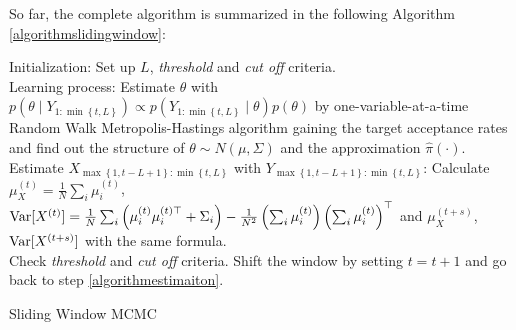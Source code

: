 So far, the complete algorithm is summarized in the following Algorithm \ref{algorithmslidingwindow}: 

\begin{algorithm}[h]
\SetAlgoLined 
Initialization: Set up $L$, \textit{threshold} and  \textit{cut off} criteria. \\
Learning process: Estimate $\theta$ with $p\left(\theta\mid Y_{1:\min \left\lbrace t,L\right\rbrace } \right) \propto p\left(Y_{1:\min \left\lbrace t,L\right\rbrace } \mid \theta \right)p\left(\theta \right)$ by one-variable-at-a-time Random Walk Metropolis-Hastings algorithm gaining the target acceptance rates and find out the structure of $\theta\sim N\left(\mu,\Sigma\right)$ and the approximation $\hat{\pi}\left(\cdot\right)$. \label{algorithmlearningsurface}\\
Estimate $X_{ \max\left\lbrace 1,t-L+1 \right\rbrace :\min \left\lbrace t,L\right\rbrace }$ with $Y_{ \max\left\lbrace 1,t-L+1 \right\rbrace :\min \left\lbrace t,L\right\rbrace }$: 
Calculate $\mu_X^{\left(t\right)} = \frac{1}{N} \sum_i \mu_i^{\left(t\right)}$, $\mathrm{Var}\lbrack X^{\left(t\right)}\rbrack = \frac{1}{N} \sum_i \left(\mu_i^{\left(t\right)} \mu_i^{\left(t\right)\top} +\Sigma_i\right) -\frac{1}{N^2} \left(\sum_i  \mu_i^{\left(t\right)}\right) \left(\sum_i \mu_i^{\left(t\right)}\right)^\top$ and $\mu_X^{\left(t+s\right)}$, $\mathrm{Var}\lbrack X^{\left(t+s\right)}\rbrack$ with the same formula.  \\
Check \textit{threshold} and  \textit{cut off} criteria. 
Shift the window by setting $t = t+1$ and go back to step \ref{algorithmestimaiton}.
 \caption{Sliding Window MCMC}\label{algorithmslidingwindow}
\end{algorithm}



